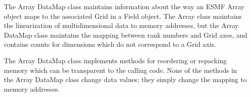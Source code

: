 

The Array DataMap class maintains information about the way an ESMF Array
object maps to the associated Grid in a Field object.  The Array class
maintains the linearization of multidimensional data to memory addresses,
but the Array DataMap class maintains the mapping between rank numbers and
Grid axes, and contains counts for dimensions which do not correspond
to a Grid axis.

The Array DataMap class implements methods for reordering or repacking
memory which can be transparent to the calling code.  None of the
methods in the Array DataMap class change data values; they simply
change the mapping to memory addresses.




